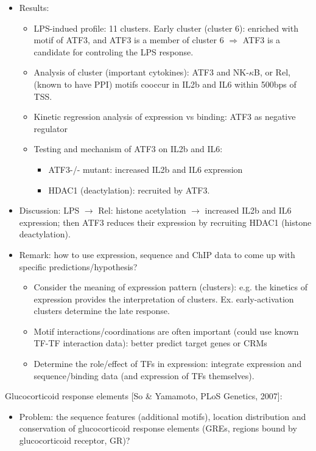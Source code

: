 \documentclass{report}
\begin{document}
\begin{enumerate}
\begin{itemize}
		\item Results:
		\begin{itemize}
			\item LPS-indued profile: 11 clusters. Early cluster (cluster 6): enriched with motif of ATF3, and ATF3 is a member of cluster 6 $\Rightarrow$ ATF3 is a candidate for controling the LPS response.  
			\item Analysis of cluster (important cytokines): ATF3 and NK-$\kappa$B, or Rel, (known to have PPI) motifs cooccur in IL2b and IL6 within 500bps of TSS. 
			\item Kinetic regression analysis of expression vs binding: ATF3 as negative regulator
			\item Testing and mechanism of ATF3 on IL2b and IL6: 
			\begin{itemize}
				\item ATF3-/- mutant: increased IL2b and IL6 expression
				\item HDAC1 (deactylation): recruited by ATF3. 
			\end{itemize}
		\end{itemize}
		
		\item Discussion: LPS $\rightarrow$ Rel: histone acetylation $\rightarrow$ increased IL2b and IL6 expression; then ATF3 reduces their expression by recruiting HDAC1 (histone deactylation). 
		
		\item Remark: how to use expression, sequence and ChIP data to come up with specific predictions/hypothesis?
		\begin{itemize}
			\item Consider the meaning of expression pattern (clusters): e.g. the kinetics of expression provides the interpretation of clusters. Ex. early-activation clusters determine the late response. 
			\item Motif interactions/coordinations are often important (could use known TF-TF interaction data): better predict target genes or CRMs
			\item Determine the role/effect of TFs in expression: integrate expression and sequence/binding data (and expression of TFs themselves). 
		\end{itemize}
	\end{itemize}
	
	Glucocorticoid response elements [So \& Yamamoto, PLoS Genetics, 2007]:
	\begin{itemize}
		\item Problem: the sequence features (additional motifs), location distribution and conservation of glucocorticoid response elements (GREs, regions bound by glucocorticoid receptor, GR)? 
		

\end{itemize}
\end{enumerate}
\end{document}
